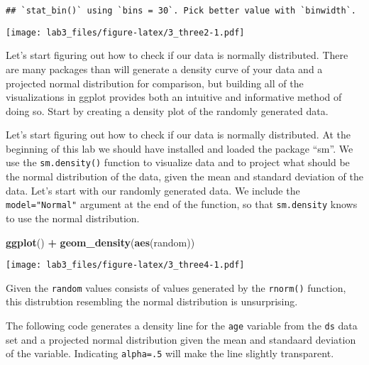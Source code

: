 \documentclass[]{article}
\newenvironment{Shaded}{\begin{snugshade}}{\end{snugshade}}
\newcommand{\KeywordTok}[1]{\textcolor[rgb]{0.13,0.29,0.53}{\textbf{#1}}}
\newcommand{\DataTypeTok}[1]{\textcolor[rgb]{0.13,0.29,0.53}{#1}}
\newcommand{\DecValTok}[1]{\textcolor[rgb]{0.00,0.00,0.81}{#1}}
\newcommand{\StringTok}[1]{\textcolor[rgb]{0.31,0.60,0.02}{#1}}
\newcommand{\OperatorTok}[1]{\textcolor[rgb]{0.81,0.36,0.00}{\textbf{#1}}}
\newcommand{\NormalTok}[1]{#1}
\begin{document}
\begin{verbatim}
## `stat_bin()` using `bins = 30`. Pick better value with `binwidth`.
\end{verbatim}

\texttt{[image: lab3\_files/figure-latex/3\_three2-1.pdf]}

Let's start figuring out how to check if our data is normally
distributed. There are many packages than will generate a density curve
of your data and a projected normal distribution for comparison, but
building all of the visualizations in ggplot provides both an intuitive
and informative method of doing so. Start by creating a density plot of
the randomly generated data.

Let's start figuring out how to check if our data is normally
distributed. At the beginning of this lab we should have installed and
loaded the package ``sm''. We use the \texttt{sm.density()} function to
visualize data and to project what should be the normal distribution of
the data, given the mean and standard deviation of the data. Let's start
with our randomly generated data. We include the \texttt{model="Normal"}
argument at the end of the function, so that \texttt{sm.density} knows
to use the normal distribution.

\begin{Shaded}
\begin{Highlighting}[]
\KeywordTok{ggplot}\NormalTok{() }\OperatorTok{+}
\StringTok{  }\KeywordTok{geom_density}\NormalTok{(}\KeywordTok{aes}\NormalTok{(random))}
\end{Highlighting}
\end{Shaded}

\texttt{[image: lab3\_files/figure-latex/3\_three4-1.pdf]}

Given the \texttt{random} values consists of values generated by the
\texttt{rnorm()} function, this distrubtion resembling the normal
distribution is unsurprising.

The following code generates a density line for the \texttt{age}
variable from the \texttt{ds} data set and a projected normal
distribution given the mean and standaard deviation of the variable.
Indicating \texttt{alpha=.5} will make the line slightly transparent.

\begin{Shaded}
\end{Shaded}
\end{document}
